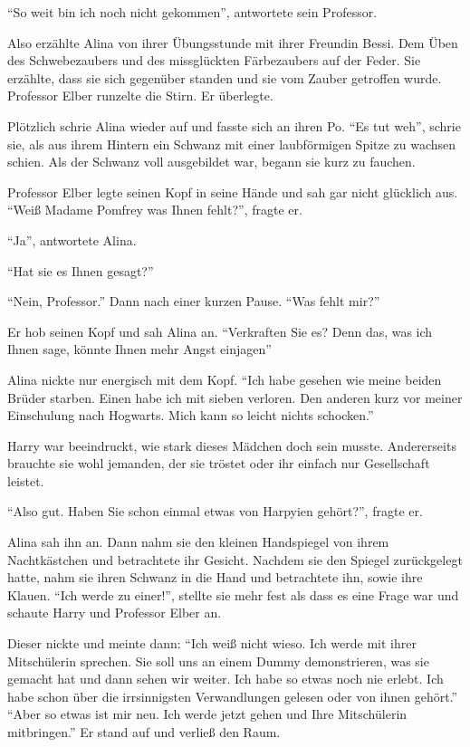 \enquote{So weit bin ich noch nicht gekommen}, antwortete sein Professor.

Also erzählte Alina von ihrer Übungsstunde mit ihrer Freundin Bessi. Dem Üben des Schwebezaubers und des missglückten Färbezaubers auf der Feder. Sie erzählte, dass sie sich gegenüber standen und sie vom Zauber getroffen wurde. Professor Elber runzelte die Stirn. Er überlegte.

Plötzlich schrie Alina wieder auf und fasste sich an ihren Po. \enquote{Es tut weh}, schrie sie, als aus ihrem Hintern ein Schwanz mit einer laubförmigen Spitze zu wachsen schien. Als der Schwanz voll ausgebildet war, begann sie kurz zu fauchen.

Professor Elber legte seinen Kopf in seine Hände und sah gar nicht glücklich aus. \enquote{Weiß Madame Pomfrey was Ihnen fehlt?}, fragte er.

\enquote{Ja}, antwortete Alina.

\enquote{Hat sie es Ihnen gesagt?}

\enquote{Nein, Professor.} Dann nach einer kurzen Pause. \enquote{Was fehlt mir?}

Er hob seinen Kopf und sah Alina an. \enquote{Verkraften Sie es? Denn das, was ich Ihnen sage, könnte Ihnen mehr Angst einjagen\abs}

Alina nickte nur energisch mit dem Kopf. \enquote{Ich habe gesehen wie meine beiden Brüder starben. Einen habe ich mit sieben verloren. Den anderen kurz vor meiner Einschulung nach Hogwarts. Mich kann so leicht nichts schocken.}

Harry war beeindruckt, wie stark dieses Mädchen doch sein musste. Andererseits brauchte sie wohl jemanden, der sie tröstet oder ihr einfach nur Gesellschaft leistet.

\enquote{Also gut. Haben Sie schon einmal etwas von Harpyien gehört?}, fragte er.

Alina sah ihn an. Dann nahm sie den kleinen Handspiegel von ihrem Nachtkästchen und betrachtete ihr Gesicht. Nachdem sie den Spiegel zurückgelegt hatte, nahm sie ihren Schwanz in die Hand und betrachtete ihn, sowie ihre Klauen. \enquote{Ich werde zu einer!}, stellte sie mehr fest als dass es eine Frage war und schaute Harry und Professor Elber an.

Dieser nickte und meinte dann: \enquote{Ich weiß nicht wieso. Ich werde mit ihrer Mitschülerin sprechen. Sie soll uns an einem Dummy demonstrieren, was sie gemacht hat und dann sehen wir weiter. Ich habe so etwas noch nie erlebt. Ich habe schon über die irrsinnigsten Verwandlungen gelesen oder von ihnen gehört.}  \enquote{Aber so etwas ist mir neu. \gst Ich werde jetzt gehen und Ihre Mitschülerin mitbringen.} Er stand auf und verließ den Raum.

